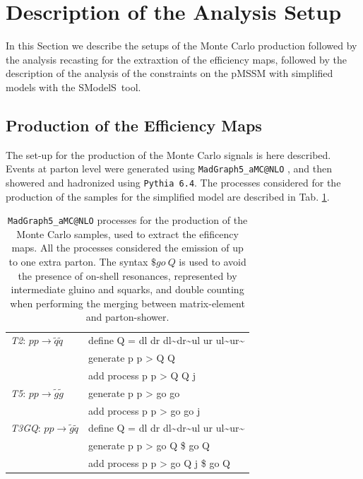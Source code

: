 \documentclass[a4paper,11pt]{article}
\newcommand{\SMO}{{\sc SModelS}}
\newcommand{\TGQ}{ \textit{T3GQ}}
\newcommand{\Ttwo}{ \textit{T2}}
\newcommand{\Tfive}{ \textit{T5}}
\begin{document}
\section{Description of the Analysis Setup}\label{sec::setup}
In this Section we describe the setups of the Monte Carlo production followed by the analysis recasting for the extraxtion of the efficiency maps, followed by the description of the analysis of the constraints on the pMSSM with simplified models with the \SMO~tool.
\subsection{Production of the Efficiency Maps}
The set-up for the production of the Monte Carlo signals is here described. Events at parton level were generated using \texttt{MadGraph5\_aMC@NLO}\cite{2011uj} , and then showered and hadronized using \texttt{Pythia 6.4}\cite{Sjostrand:2006za}. The processes considered for the production of the samples for the simplified model are described in Tab. \ref{mg5_processes}.
\begin{table}[!htbp]
\begin{center}
\renewcommand{\arraystretch}{1.3}
\begin{tabular}{ l l } \toprule
\Ttwo: $p p \rightarrow \tilde q \tilde q$ & define Q = dl dr dl\textasciitilde dr\textasciitilde ul ur ul\textasciitilde ur\textasciitilde \\
& generate p p > Q Q  \\
&  add process p p > Q Q j \\  \hline
%
\Tfive: $p p \rightarrow \tilde g \tilde g$ & generate p p > go go \\
&  add process p p > go go j \\ \hline
%
\TGQ: $p p \rightarrow \tilde g \tilde q$ & define Q = dl dr dl\textasciitilde dr\textasciitilde ul ur ul\textasciitilde ur\textasciitilde \\
& generate p p > go Q \$ go Q \\
& add process p p > go Q j \$ go Q \\ \bottomrule 
%
\end{tabular}
\end{center}
\caption{\texttt{MadGraph5\_aMC@NLO} processes for the production of the Monte Carlo samples, used to extract the efificency maps. All the processes considered the emission of up to one extra parton. The syntax $\$go \ Q$ is used to avoid the presence of on-shell resonances, represented by intermediate gluino and squarks, and double counting when performing the merging between matrix-element and parton-shower.}
\label{mg5_processes}
\end{table}
\end{document}
